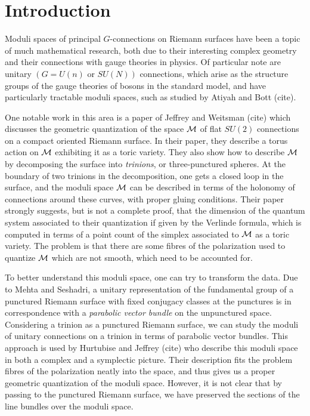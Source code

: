 \section{Introduction}
\label{s:intro}

	Moduli spaces of principal $G$-connections on Riemann surfaces have been a topic of much mathematical research, both due to their interesting complex geometry and their connections with gauge theories in physics. Of particular note are unitary $(G=U(n) \text{ or }SU(N))$ connections, which arise as the structure groups of the gauge theories of bosons in the standard model, and have particularly tractable moduli spaces, such as studied by Atiyah and Bott (cite). 
	
	One notable work in this area is a paper of Jeffrey and Weitsman (cite) which discusses the geometric quantization of the space $\mathcal{M}$ of flat $SU(2)$ connections on a compact oriented Riemann surface. In their paper, they describe a torus action on $\mathcal{M}$ exhibiting it as a toric variety. They also show how to describe $\mathcal{M}$ by decomposing the surface into \textit{trinions}, or three-punctured spheres. At the boundary of two trinions in the decomposition, one gets a closed loop in the surface, and the moduli space $\mathcal{M}$ can be described in terms of the holonomy of connections around these curves, with proper gluing conditions. Their paper strongly suggests, but is not a complete proof, that the dimension of the quantum system associated to their quantization if given by the Verlinde formula, which is computed in terms of a point count of the simplex associated to $\mathcal{M}$ as a toric variety. The problem is that there are some fibres of the polarization used to quantize $\mathcal{M}$ which are not smooth, which need to be accounted for.
	
	To better understand this moduli space, one can try to transform the data. Due to Mehta and Seshadri, a unitary representation of the fundamental group of a punctured Riemann surface with fixed conjugacy classes at the punctures is in correspondence with a \textit{parabolic vector bundle} on the unpunctured space. Considering a trinion as a punctured Riemann surface, we can study the moduli of unitary connections on a trinion in terms of parabolic vector bundles. This approach is used by Hurtubise and Jeffrey (cite) who describe this moduli space in both a complex and a symplectic picture. Their description fits the problem fibres of the polarization neatly into the space, and thus gives us a proper geometric quantization of the moduli space. However, it is not clear that by passing to the punctured Riemann surface, we have preserved the sections of the line bundles over the moduli space. 
	

